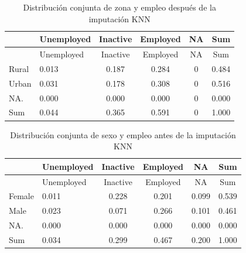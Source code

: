 \documentclass[
  spanish,
  12pt,
]{book}
\newenvironment{Shaded}{\begin{snugshade}}{\end{snugshade}}
\newcommand{\AttributeTok}[1]{\textcolor[rgb]{0.13,0.29,0.53}{#1}}
\newcommand{\FunctionTok}[1]{\textcolor[rgb]{0.13,0.29,0.53}{\textbf{#1}}}
\newcommand{\NormalTok}[1]{#1}
\newcommand{\SpecialCharTok}[1]{\textcolor[rgb]{0.81,0.36,0.00}{\textbf{#1}}}
\newcommand{\StringTok}[1]{\textcolor[rgb]{0.31,0.60,0.02}{#1}}
\begin{document}
\begin{longtable}[]{@{}llcccc@{}}
\caption{\label{tab:tab-knn-zona-despues}Distribución conjunta de zona y empleo después de la imputación KNN}\tabularnewline
\toprule\noalign{}
& Unemployed & Inactive & Employed & NA & Sum \\
\midrule\noalign{}
\endfirsthead
\toprule\noalign{}
& Unemployed & Inactive & Employed & NA & Sum \\
\midrule\noalign{}
\endhead
\bottomrule\noalign{}
\endlastfoot
Rural & 0.013 & 0.187 & 0.284 & 0 & 0.484 \\
Urban & 0.031 & 0.178 & 0.308 & 0 & 0.516 \\
NA. & 0.000 & 0.000 & 0.000 & 0 & 0.000 \\
Sum & 0.044 & 0.365 & 0.591 & 0 & 1.000 \\
\end{longtable}

\begin{Shaded}
\end{Shaded}

\begin{longtable}[]{@{}llcccc@{}}
\caption{\label{tab:tab-knn-sexo-antes}Distribución conjunta de sexo y empleo antes de la imputación KNN}\tabularnewline
\toprule\noalign{}
& Unemployed & Inactive & Employed & NA & Sum \\
\midrule\noalign{}
\endfirsthead
\toprule\noalign{}
& Unemployed & Inactive & Employed & NA & Sum \\
\midrule\noalign{}
\endhead
\bottomrule\noalign{}
\endlastfoot
Female & 0.011 & 0.228 & 0.201 & 0.099 & 0.539 \\
Male & 0.023 & 0.071 & 0.266 & 0.101 & 0.461 \\
NA. & 0.000 & 0.000 & 0.000 & 0.000 & 0.000 \\
Sum & 0.034 & 0.299 & 0.467 & 0.200 & 1.000 \\
\end{longtable}
\end{document}
